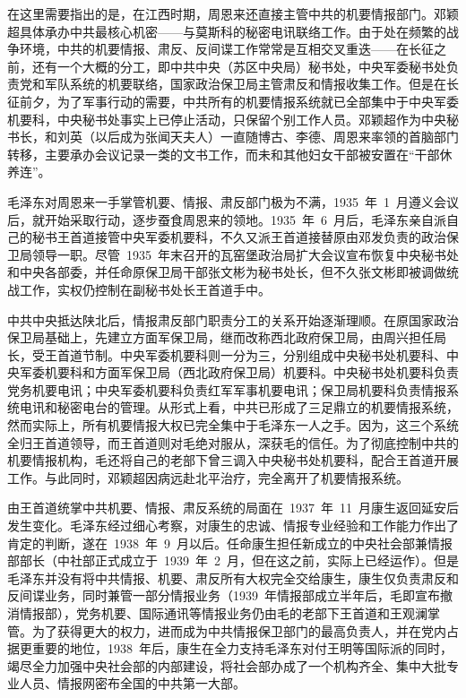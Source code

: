 在这里需要指出的是，在江西时期，周恩来还直接主管中共的机要情报部门。邓颖超具体承办中共最核心机密——与莫斯科的秘密电讯联络工作。由于处在频繁的战争环境，中共的机要情报、肃反、反间谍工作常常是互相交叉重迭——在长征之前，还有一个大概的分工，即中共中央（苏区中央局）秘书处，中央军委秘书处负责党和军队系统的机要联络，国家政治保卫局主管肃反和情报收集工作。但是在长征前夕，为了军事行动的需要，中共所有的机要情报系统就已全部集中于中央军委机要科，中央秘书处事实上已停止活动，只保留个别工作人员。邓颖超作为中央秘书长，和刘英（以后成为张闻天夫人）一直随博古、李德、周恩来率领的首脑部门转移，主要承办会议记录一类的文书工作，而未和其他妇女干部被安置在“干部休养连”。

毛泽东对周恩来一手掌管机要、情报、肃反部门极为不满，1935~年~1~月遵义会议后，就开始采取行动，逐步蚕食周恩来的领地。1935~年~6~月后，毛泽东亲自派自己的秘书王首道接管中央军委机要科，不久又派王首道接替原由邓发负责的政治保卫局领导一职。尽管~1935~年末召开的瓦窑堡政治局扩大会议宣布恢复中央秘书处和中央各部委，并任命原保卫局干部张文彬为秘书处长，但不久张文彬即被调做统战工作，实权仍控制在副秘书处长王首道手中。

中共中央抵达陕北后，情报肃反部门职责分工的关系开始逐渐理顺。在原国家政治保卫局基础上，先建立方面军保卫局，继而改称西北政府保卫局，由周兴担任局长，受王首道节制。中央军委机要科则一分为三，分别组成中央秘书处机要科、中央军委机要科和方面军保卫局（西北政府保卫局）机要科。中央秘书处机要科负责党务机要电讯；中央军委机要科负责红军军事机要电讯；保卫局机要科负责情报系统电讯和秘密电台的管理。从形式上看，中共已形成了三足鼎立的机要情报系统，然而实际上，所有机要情报大权已完全集中于毛泽东一人之手。因为，这三个系统全归王首道领导，而王首道则对毛绝对服从，深获毛的信任。为了彻底控制中共的机要情报机构，毛还将自己的老部下曾三调入中央秘书处机要科，配合王首道开展工作。与此同时，邓颖超因病远赴北平治疗，完全离开了机要情报系统。

由王首道统掌中共机要、情报、肃反系统的局面在~1937~年~11~月康生返回延安后发生变化。毛泽东经过细心考察，对康生的忠诚、情报专业经验和工作能力作出了肯定的判断，遂在~1938~年~9~月以后。任命康生担任新成立的中央社会部兼情报部部长（中社部正式成立于~1939~年~2~月，但在这之前，实际上已经运作）。但是毛泽东并没有将中共情报、机要、肃反所有大权完全交给康生，康生仅负责肃反和反间谍业务，同时兼管一部分情报业务（1939~年情报部成立半年后，毛即宣布撤消情报部），党务机要、国际通讯等情报业务仍由毛的老部下王首道和王观澜掌管。为了获得更大的权力，进而成为中共情报保卫部门的最高负责人，并在党内占据更重要的地位，1938~年后，康生在全力支持毛泽东对付王明等国际派的同时，竭尽全力加强中央社会部的内部建设，将社会部办成了一个机构齐全、集中大批专业人员、情报网密布全国的中共第一大部。

